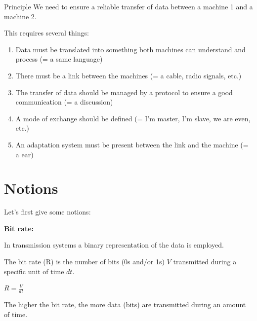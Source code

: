 \documentclass{beamer}[10pt, usepdftitle=false, handout]
\begin{document}
	\begin{frame}
	
	\begin{block}{Principle}
	We need to ensure a reliable transfer of data between a machine 1 and a machine 2.
	\end{block}	
	\vspace*{1em}
	
	This requires several things:
	\vspace*{1em}
	
	\begin{enumerate}
	\item{Data must be translated into something both machines can understand and process (= a same language)}
	\item{There must be a link between the machines (= a cable, radio signals, etc.)}
	\item{The transfer of data should be managed by a protocol to ensure a good communication (= a discussion)}
	\item{A mode of exchange should be defined (= I'm master, I'm slave, we are even, etc.)}	
	\item{An adaptation system must be present between the link and the machine (= a ear)}	
	\end{enumerate}		
		

	\end{frame}

	\section{Notions}
	
	\begin{frame}
		
	Let's first give some notions:
	\vspace*{1em}
	
	\textbf{Bit rate:}
	\vspace*{1em}
	
	In transmission systems a binary representation of the data is employed.
	\vspace*{0.5em}
	
	The bit rate (R) is the number of bits (0s and/or 1s) $V$ transmitted during a specific unit of time $dt$.
	\vspace*{0.5em}
	
	$R = \frac{V}{dt}$
	\vspace*{0.5em}
	
	The higher the bit rate, the more data (bits) are transmitted during an amount of time.

	
	\end{frame}
\end{document}
